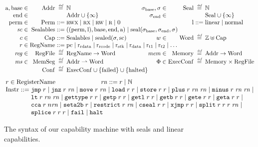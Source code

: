\documentclass[acmsmall,screen]{acmart}\settopmatter{}
\renewcommand{\MemSeg}{\shareddom{MemSeg}}
\renewcommand{\Reg}{\shareddom{RegFile}}
\renewcommand{\RegName}{\shareddom{RegName}}
\renewcommand{\SealableCaps}{\shareddom{Sealables}}
\renewcommand{\rretc}{\mathrm{r}_{\mathrm{rcode}}}
\renewcommand{\rretd}{\mathrm{r}_{\mathrm{rdata}}}
\begin{document}
\begin{figure}[tb]
  \centering
  \[
  \arraycolsep=1.4pt
  \begin{array}{rrcl l rrcl}
   \addrbnf,\basebnf \in & \Addr & \defeq & \nats & \phantom{mak} & \sealbasebnf, \sigma \in & \Seal & \defeq & \nats\\
    \aendbnf \in & & & \Addr \cup \{\infty \} & & \sealendbnf \in & & & \Seal \cup \{\infty \}\\
    \permbnf \in& \Perm & \defbnf & \rwx \mid \rx \mid \rw \mid \ro \mid \noperm & & &\linbnf & \defbnf & \linear \mid \normal\\
    \vsc \in &\SealableCaps&\defbnf & \multicolumn{6}{l}{((\permbnf,\linbnf),\basebnf,\aendbnf,\addrbnf) \mid \seal{\sealbasebnf,\sealendbnf,\sigma}}\\
    c \in&\Caps& \defbnf &  \SealableCaps \mid \sealed{\sigma,\scbnf} & & w \in &\Word & \defeq & \ints \uplus \Caps\\ 
    r \in& \RegName & \defbnf & \multicolumn{6}{l}{\pcreg \mid \rretd \mid \rretc \mid \rstk \mid \rdata \mid \rtmp{1} \mid \rtmp{2} \mid \dots} \\
    \reg \in &\Reg & \defeq & \RegName \fun \Word & & \mem \in&\Mem & \defeq & \Addr \fun \Word\\
\ms \in  &\MemSeg & \defeq & \Addr \parfun \Word & & \Phi \in & \ExecConf & \defeq & \Mem \times \Reg\\
    &\Conf & \defeq & \multicolumn{6}{l}{\ExecConf \cup \{\failed\} \cup \{\halted\} }
  \end{array}
\]
\[
  \arraycolsep=1.4pt
\begin{array}{rcl}
\multicolumn{3}{l}{    \arraycolsep=0pt
      \com{r} \in  \tRegName \hspace{2.5cm}   \com{\rn} \defbnf \com{r} \mid \nats
}\\
  \Instr &\defbnf & \tjmp{\com{r}} \mid \tjnz{\com{r}}{\com{\rn}} \mid \tmove{\com{r}}{\com{\rn}} \mid \tload{\com{r}}{\com{r}} \mid \tstore{\com{r}}{\com{r}} \mid \tplus{\com{r}}{\com{\rn}}{\com{\rn}} \mid \tminus{\com{r}}{\com{\rn}}{\com{\rn}} \mid\\
         & & \tlt{\com{r}}{\com{\rn}}{\com{\rn}} \mid \tisptr{\com{r}}{\com{r}} \mid\tgetp{\com{r}}{\com{r}} \mid \tgetlin{\com{r}}{\com{r}} \mid \tgetb{\com{r}}{\com{r}} \mid \tgete{\com{r}}{\com{r}} \mid \tgeta{\com{r}}{\com{r}}  \mid \\
  & & \tcca{\com{r}}{\com{n\rn}} \mid \tsetatob{\com{r}} \mid \trestrict{\com{r}}{\com{\rn}} \mid \tcseal{\com{r}}{\com{r}} \mid \txjmp{\com{r}}{\com{r}} \mid  \tsplit{\com{r}}{\com{r}}{\com{r}}{\com{\rn}} \mid\\ 
      & & \tsplice{\com{r}}{\com{r}}{\com{r}} \mid \tfail \mid \thalt 
\end{array}
\]
  \caption{The syntax of our capability machine with seals and linear capabilities.}
  \label{fig:target-syntax}
\end{figure}
\end{document}
